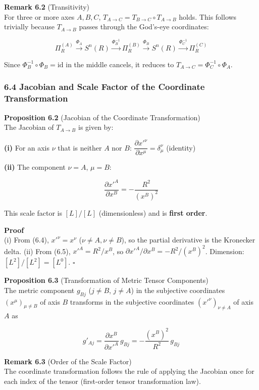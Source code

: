 \documentclass[a4paper,11pt]{article}
\theoremstyle{definition}
\begin{document}
\textbf{Remark 6.2} (Transitivity)\\
For three or more axes \(A, B, C\), \(T_{A \to C} = T_{B \to C} \circ T_{A \to B}\) holds. This follows trivially because \(T_{A \to B}\) passes through the God's-eye coordinates:

\[\Pi_R^{(A)} \xrightarrow{\Phi_A} S^n(R) \xrightarrow{\Phi_B^{-1}} \Pi_R^{(B)} \xrightarrow{\Phi_B} S^n(R) \xrightarrow{\Phi_C^{-1}} \Pi_R^{(C)}\]

Since \(\Phi_B^{-1} \circ \Phi_B = \mathrm{id}\) in the middle cancels, it reduces to \(T_{A \to C} = \Phi_C^{-1} \circ \Phi_A\).

\subsubsection{6.4 Jacobian and Scale Factor of the Coordinate Transformation}\label{jacobian-and-scale-factor-of-the-coordinate-transformation}

\textbf{Proposition 6.2} (Jacobian of the Coordinate Transformation)\\
The Jacobian of \(T_{A \to B}\) is given by:

\textbf{(i)} For an axis \(\nu\) that is neither \(A\) nor \(B\): \(\dfrac{\partial x'^\nu}{\partial x^\mu} = \delta^\nu_\mu\) (identity)

\textbf{(ii)} The component \(\nu = A\), \(\mu = B\):

\[\frac{\partial x'^A}{\partial x^B} = -\frac{R^2}{(x^B)^2} \tag{6.6}\]

This scale factor is \([L]/[L]\) (dimensionless) and is \textbf{first order}.

\textbf{Proof}\\
(i) From (6.4), \(x'^\nu = x^\nu\) (\(\nu \neq A, \nu \neq B\)), so the partial derivative is the Kronecker delta. (ii) From (6.5), \(x'^A = R^2/x^B\), so \(\partial x'^A/\partial x^B = -R^2/(x^B)^2\). Dimension: \([L^2]/[L^2] = [L^0]\). \(\square\)

\textbf{Proposition 6.3} (Transformation of Metric Tensor Components)\\
The metric component \(g_{Bj}\) (\(j \neq B\), \(j \neq A\)) in the subjective coordinates \((x^\mu)_{\mu \neq B}\) of axis \(B\) transforms in the subjective coordinates \((x'^\nu)_{\nu \neq A}\) of axis \(A\) as

\[g'_{Aj} = \frac{\partial x^B}{\partial x'^A}\, g_{Bj} = -\frac{(x^B)^2}{R^2}\, g_{Bj} \tag{6.7}\]

\textbf{Remark 6.3} (Order of the Scale Factor)\\
The coordinate transformation follows the rule of applying the Jacobian once for each index of the tensor (first-order tensor transformation law).
\end{document}
